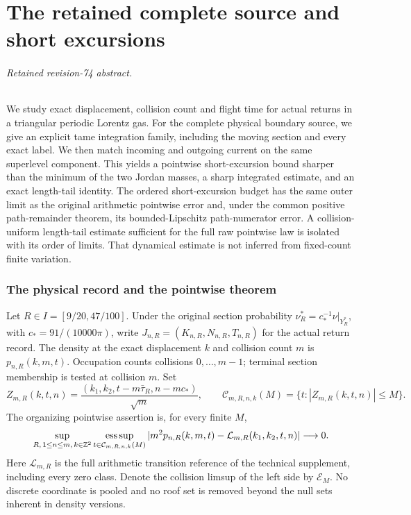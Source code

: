 \documentclass[11pt,reqno]{amsart}
\numberwithin{equation}{section}
\theoremstyle{definition}\newtheorem{definition}[theorem]{Definition}
\theoremstyle{remark}\newtheorem{remark}[theorem]{Remark}
\theoremstyle{definition}\newtheorem{inputstatement}[theorem]{Input statement}
\newcommand{\esssup}{\operatorname*{ess\,sup}}
\begin{document}




\part{The retained complete source and short excursions}
\paragraph{Retained revision-74 abstract.}

We study exact displacement, collision count and flight time for actual
returns in a triangular periodic Lorentz gas. For the complete physical
boundary source, we give an explicit tame integration family, including
the moving section and every exact label. We then match incoming and
outgoing current on the same superlevel component. This yields a
pointwise short-excursion bound sharper than the minimum of the two
Jordan masses, a sharp integrated estimate, and an exact length-tail
identity. The ordered short-excursion budget has the same outer limit
as the original arithmetic pointwise error and, under the common
positive path-remainder theorem, its bounded-Lipschitz path-numerator
error. A collision-uniform length-tail estimate sufficient for the
full raw pointwise law is isolated with its order of limits. That
dynamical estimate is not inferred from fixed-count finite variation.



\section{The physical record and the pointwise theorem}
\label{sec:v74-introduction}
Let $R\in I=[9/20,47/100]$. Under the original section probability
$\nu_R^*=c_*^{-1}\nu|_{Y_R^*}$, with $c_*=91/(10000\pi)$, write
$J_{n,R}=(K_{n,R},N_{n,R},T_{n,R})$ for the actual return record.
The density at the exact displacement $k$ and collision count $m$
is $p_{n,R}(k,m,t)$. Occupation counts collisions $0,\ldots,m-1$;
terminal section membership is tested at collision $m$. Set
\[
 Z_{m,R}(k,t,n)=\frac{(k_1,k_2,t-m\bar\tau_R,n-mc_*)}{\sqrt m},
 \qquad \mathcal C_{m,R,n,k}(M)=\{t:|Z_{m,R}(k,t,n)|\le M\}.
\]
The organizing pointwise assertion is, for every finite $M$,
\begin{equation}\label{eq:v74-original-target}
 \sup_{R,\,1\le n\le m,\,k\in\Z^2}
 \esssup_{t\in\mathcal C_{m,R,n,k}(M)}
 |m^2p_{n,R}(k,m,t)-\mathcal L_{m,R}(k_1,k_2,t,n)|\longrightarrow0.
\end{equation}
Here $\mathcal L_{m,R}$ is the full arithmetic transition reference
of the technical supplement, including every zero class. Denote the
collision limsup of the left side by $\mathcal E_M$. No discrete
coordinate is pooled and no roof set is removed beyond the null sets
inherent in density versions.
\end{document}
